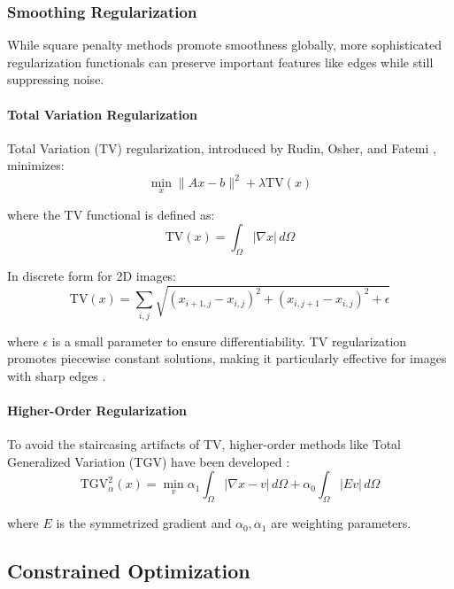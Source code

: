 \documentclass[nomenclature, english, bibtex]{kththesis}
\numberwithin{listing}{chapter}
\begin{document}
\subsubsection{Smoothing Regularization}

While square penalty methods promote smoothness globally, more sophisticated regularization functionals can preserve important features like edges while still suppressing noise.

\paragraph{Total Variation Regularization}
Total Variation (TV) regularization, introduced by Rudin, Osher, and Fatemi \cite{rudin1992nonlinear}, minimizes:
\begin{equation}
\min_x \|Ax - b\|^2 + \lambda \text{TV}(x)
\end{equation}

where the TV functional is defined as:
\begin{equation}
\text{TV}(x) = \int_\Omega |\nabla x| \, d\Omega
\end{equation}

In discrete form for 2D images:
\begin{equation}
\text{TV}(x) = \sum_{i,j} \sqrt{(x_{i+1,j} - x_{i,j})^2 + (x_{i,j+1} - x_{i,j})^2 + \epsilon}
\end{equation}

where $\epsilon$ is a small parameter to ensure differentiability. TV regularization promotes piecewise constant solutions, making it particularly effective for images with sharp edges \cite{chambolle2010introduction}.

\paragraph{Higher-Order Regularization}
To avoid the staircasing artifacts of TV, higher-order methods like Total Generalized Variation (TGV) have been developed \cite{bredies2010total}:
\begin{equation}
\text{TGV}^2_\alpha(x) = \min_v \alpha_1 \int_\Omega |\nabla x - v| \, d\Omega + \alpha_0 \int_\Omega |Ev| \, d\Omega
\end{equation}

where $E$ is the symmetrized gradient and $\alpha_0, \alpha_1$ are weighting parameters.

\subsection{Constrained Optimization}
\end{document}
